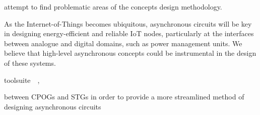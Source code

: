 \documentclass[british, journal]{IEEEtran}
\newcommand{\noun}[1]{\textsc{#1}}
\begin{document}
attempt to find problematic areas of the concepts design methodology.

As the Internet-of-Things becomes ubiquitous, asynchronous circuits
will be key in designing energy-efficient and reliable IoT nodes,
particularly at the interfaces between analogue and digital domains,
such as power management units. We believe that high-level asynchronous
concepts could be instrumental in the design of these systems.

toolsuite~\cite{2015_workcraft_scenco}~\cite{Scenco_paper},



%

between CPOGs and STGs in order to provide a more streamlined method of
designing asynchronous circuits
\end{document}
